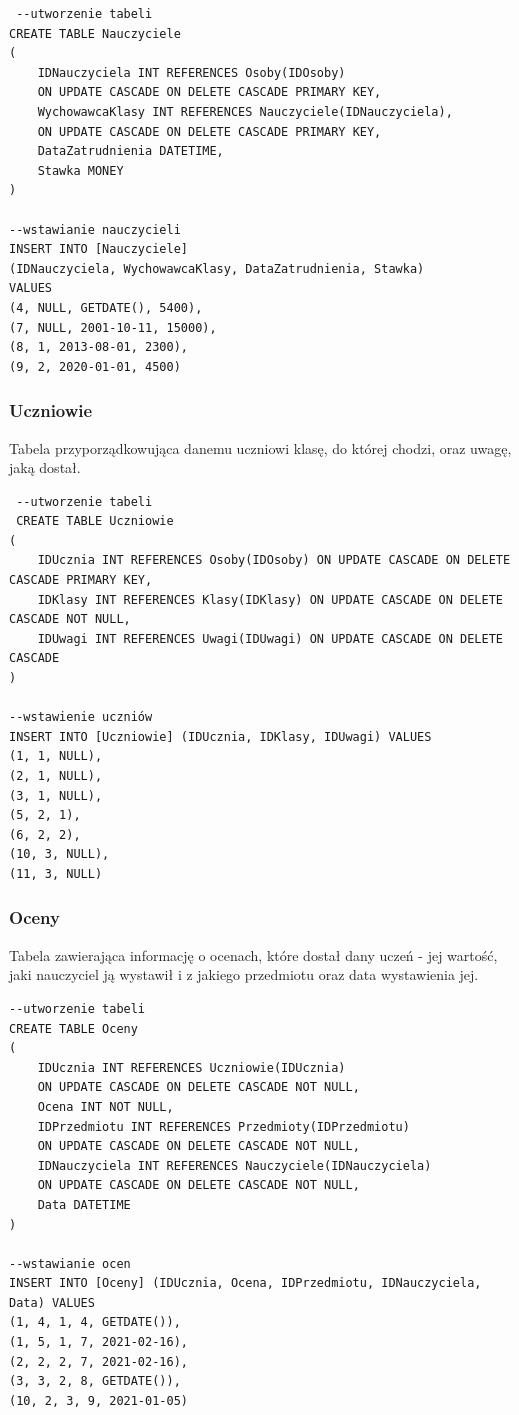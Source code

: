 \documentclass[60pt]{article}
\begin{document}
 \begin{verbatim}
 --utworzenie tabeli
CREATE TABLE Nauczyciele
(
	IDNauczyciela INT REFERENCES Osoby(IDOsoby) 
	ON UPDATE CASCADE ON DELETE CASCADE PRIMARY KEY,
	WychowawcaKlasy INT REFERENCES Nauczyciele(IDNauczyciela),
	ON UPDATE CASCADE ON DELETE CASCADE PRIMARY KEY,
	DataZatrudnienia DATETIME,
	Stawka MONEY
)

--wstawianie nauczycieli
INSERT INTO [Nauczyciele]
(IDNauczyciela, WychowawcaKlasy, DataZatrudnienia, Stawka) 
VALUES
(4, NULL, GETDATE(), 5400),
(7, NULL, 2001-10-11, 15000),
(8, 1, 2013-08-01, 2300), 
(9, 2, 2020-01-01, 4500)

 \end{verbatim}
 
\subsubsection{Uczniowie}
Tabela przyporządkowująca danemu uczniowi klasę, do której chodzi, oraz uwagę, jaką dostał.
 
\begin{verbatim}
 --utworzenie tabeli
 CREATE TABLE Uczniowie
(
	IDUcznia INT REFERENCES Osoby(IDOsoby) ON UPDATE CASCADE ON DELETE CASCADE PRIMARY KEY,
	IDKlasy INT REFERENCES Klasy(IDKlasy) ON UPDATE CASCADE ON DELETE CASCADE NOT NULL,
	IDUwagi INT REFERENCES Uwagi(IDUwagi) ON UPDATE CASCADE ON DELETE CASCADE
)

--wstawienie uczniów
INSERT INTO [Uczniowie] (IDUcznia, IDKlasy, IDUwagi) VALUES
(1, 1, NULL),
(2, 1, NULL),
(3, 1, NULL),
(5, 2, 1),
(6, 2, 2), 
(10, 3, NULL), 
(11, 3, NULL)
\end{verbatim}
 
 \subsubsection{Oceny}
Tabela zawierająca informację o ocenach, które dostał dany uczeń - jej wartość, jaki nauczyciel ją wystawił i z jakiego przedmiotu oraz data wystawienia jej.
 
\begin{verbatim}
--utworzenie tabeli
CREATE TABLE Oceny
(
	IDUcznia INT REFERENCES Uczniowie(IDUcznia) 
	ON UPDATE CASCADE ON DELETE CASCADE NOT NULL,
	Ocena INT NOT NULL,
	IDPrzedmiotu INT REFERENCES Przedmioty(IDPrzedmiotu) 
	ON UPDATE CASCADE ON DELETE CASCADE NOT NULL,
	IDNauczyciela INT REFERENCES Nauczyciele(IDNauczyciela) 
	ON UPDATE CASCADE ON DELETE CASCADE NOT NULL,
	Data DATETIME
)

--wstawianie ocen
INSERT INTO [Oceny] (IDUcznia, Ocena, IDPrzedmiotu, IDNauczyciela, Data) VALUES
(1, 4, 1, 4, GETDATE()),
(1, 5, 1, 7, 2021-02-16),
(2, 2, 2, 7, 2021-02-16),
(3, 3, 2, 8, GETDATE()),
(10, 2, 3, 9, 2021-01-05)
\end{verbatim}
\end{document}
